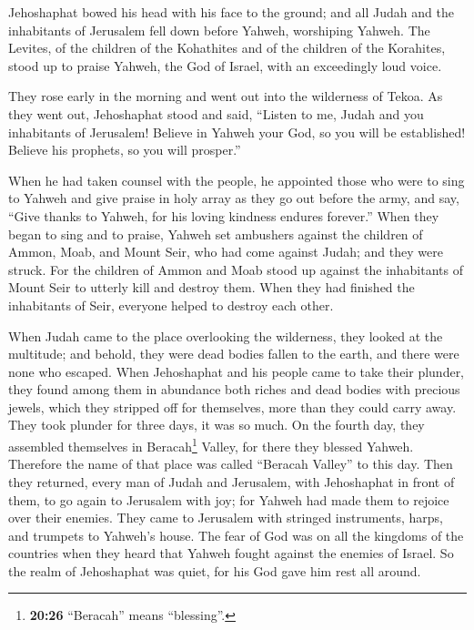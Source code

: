  Jehoshaphat bowed his head with his face to the ground;
and all Judah and the inhabitants of Jerusalem fell down before Yahweh,
worshiping Yahweh.  The Levites, of the children of the
Kohathites and of the children of the Korahites, stood up to praise
Yahweh, the God of Israel, with an exceedingly loud voice.

 They rose early in the morning and went out into the
wilderness of Tekoa. As they went out, Jehoshaphat stood and said,
``Listen to me, Judah and you inhabitants of Jerusalem! Believe in
Yahweh your God, so you will be established! Believe his prophets, so
you will prosper.''

 When he had taken counsel with the people, he appointed
those who were to sing to Yahweh and give praise in holy array as they
go out before the army, and say, ``Give thanks to Yahweh, for his loving
kindness endures forever.''  When they began to sing and
to praise, Yahweh set ambushers against the children of Ammon, Moab, and
Mount Seir, who had come against Judah; and they were struck.
 For the children of Ammon and Moab stood up against the
inhabitants of Mount Seir to utterly kill and destroy them. When they
had finished the inhabitants of Seir, everyone helped to destroy each
other.

 When Judah came to the place overlooking the wilderness,
they looked at the multitude; and behold, they were dead bodies fallen
to the earth, and there were none who escaped.  When
Jehoshaphat and his people came to take their plunder, they found among
them in abundance both riches and dead bodies with precious jewels,
which they stripped off for themselves, more than they could carry away.
They took plunder for three days, it was so much.  On the
fourth day, they assembled themselves in Beracah\footnote{\textbf{20:26}
  ``Beracah'' means ``blessing''.} Valley, for there they blessed
Yahweh. Therefore the name of that place was called ``Beracah Valley''
to this day.  Then they returned, every man of Judah and
Jerusalem, with Jehoshaphat in front of them, to go again to Jerusalem
with joy; for Yahweh had made them to rejoice over their enemies.
 They came to Jerusalem with stringed instruments, harps,
and trumpets to Yahweh's house.  The fear of God was on
all the kingdoms of the countries when they heard that Yahweh fought
against the enemies of Israel.  So the realm of
Jehoshaphat was quiet, for his God gave him rest all around.

